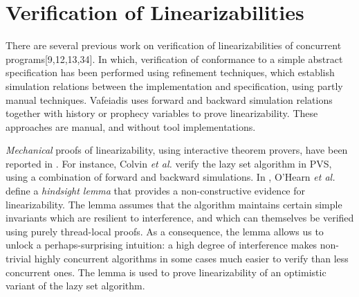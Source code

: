 \section{Verification of Linearizabilities}
There are several previous work on verification of linearizabilities of concurrent programs[9,12,13,34]. In which, verification of conformance to a simple abstract specification has been performed
using refinement techniques, which establish simulation relations between the implementation and specification, using
partly manual techniques. Vafeiadis \cite{Vafeiadis:Thesis}
uses forward and backward simulation relations together with history or prophecy variables to prove linearizability. These approaches are manual, and without tool implementations.



{\it Mechanical} proofs of linearizability, using interactive theorem
provers, have been reported in 
\cite{Colvin:Lazy-List,Derrick:fm14,SWD:cav12,SDW:tcl14}.
%
For instance, Colvin {\it et al.} \cite{Colvin:Lazy-List}
verify the lazy set algorithm in  PVS,
using a combination of forward and backward simulations. In \cite{OHearnlist}, O'Hearn {\it et al.}  define a {\it hindsight lemma} that provides a non-constructive evidence for linearizability. The lemma assumes that the algorithm maintains certain simple invariants which are resilient to interference, and which
can themselves be verified using purely thread-local proofs. As a
consequence, the lemma allows us to unlock a perhaps-surprising
intuition: a high degree of interference makes non-trivial highly concurrent algorithms in some cases much easier to verify than less
concurrent ones.
The lemma is used to prove linearizability of an optimistic variant of 
the lazy set algorithm.

